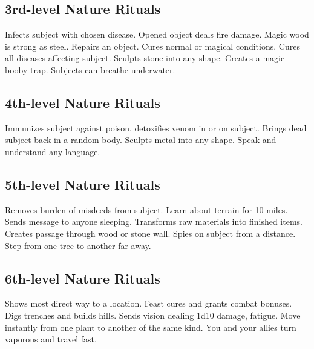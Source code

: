 \subsection{3rd-level Nature Rituals}
\begin{rituallist}
     Infects subject with chosen disease.
     Opened object deals fire damage.
     Magic wood is strong as steel.
     Repairs an object.
     Cures normal or magical conditions.
     Cures all diseases affecting subject.
     Sculpts stone into any shape.
     Creates a magic booby trap.
     Subjects can breathe underwater.
\end{rituallist}

\subsection{4th-level Nature Rituals}
\begin{rituallist}
     Immunizes subject against poison, detoxifies venom in or on subject.
     Brings dead subject back in a random body.
     Sculpts metal into any shape.
     Speak and understand any language.
\end{rituallist}

\subsection{5th-level Nature Rituals}
\begin{rituallist}
    \F\M Removes burden of misdeeds from subject.
     Learn about terrain for 10 miles.
     Sends message to anyone sleeping.
     Transforms raw materials into finished items.
     Creates passage through wood or stone wall.
    \F Spies on subject from a distance.
     Step from one tree to another far away.
\end{rituallist}

\subsection{6th-level Nature Rituals}
\begin{rituallist}
     Shows most direct way to a location.
     Feast cures and grants combat bonuses.
     Digs trenches and builds hills.
     Sends vision dealing 1d10 damage, fatigue.
     Move instantly from one plant to another of the same kind.
     You and your allies turn vaporous and travel fast.
\end{rituallist}

